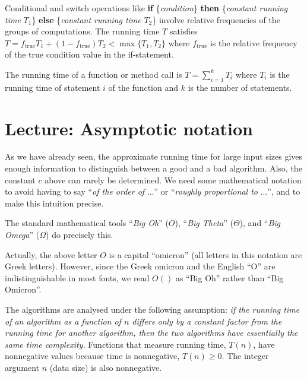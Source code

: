 Conditional and switch operations like \textbf{if}
\{\emph{condition}\} \textbf{then} \{\emph{constant running time}
$T_1$\} \textbf{else} \{\emph{constant running time} $T_2$\} involve
relative frequencies of the groups of computations.  The running time
$T$ satisfies $T = f_\mathrm{true} T_1 + (1 - f_\mathrm{true}) T_2 <
\max \{ T_1, T_2 \}$ where $f_\mathrm{true}$ is the relative frequency
of the true condition value in the if-statement.

The running time of a function or method call is $T = \sum_{i=1}^{k}T_i$
where $T_i$ is the running time of statement \(i\) of the function
and $k$ is the number of statements.


\chapter{Lecture: Asymptotic notation}



As we have already seen, the approximate running time for large input
sizes gives enough information to distinguish between a good and a bad
algorithm. Also, the constant $c$ above can rarely be determined. We
need some mathematical notation to avoid having to say ``\emph{of the
order of} $\ldots$''  or ``\emph{roughly proportional to} $\ldots$'',
and to make this intuition precise.

The standard mathematical tools ``\emph{Big Oh}'' ($O$), ``\emph{Big
Theta}'' ($\Theta$), and ``\emph{Big Omega}'' ($\Omega$) do 
precisely this.

\begin{note}
Actually, the above letter $O$ is a capital ``omicron''  (all
letters in this notation are Greek letters). However, since the Greek
omicron and the English ``O'' are indistinguishable in most fonts, we
read $O()$ as ``Big Oh'' rather than ``Big Omicron''. 
\end{note}

The algorithms are analysed under the following assumption: \emph{if
the running time of an algorithm as a function of $n$ differs only by a
constant factor from the  running time for another algorithm, then the
two algorithms have essentially the same time complexity.} Functions that
measure running time, $T(n)$, have nonnegative values because time is
nonnegative, $T(n) \ge 0$. The integer argument $n$ (data size) is also
nonnegative.

